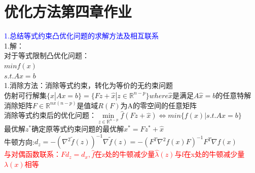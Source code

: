 \documentclass{article}
\begin{document}
{\centering\section*{优化方法第四章作业}}
\textcolor{blue}{1.总结等式约束凸优化问题的求解方法及相互联系}\\
1.解：\\
对于等式限制凸优化问题：\\
$min f(x)$\\
$s.t. Ax = b$\\
1.消除方法：消除等式约束，转化为等价的无约束问题\\
仿射可行解集$\{x|Ax = b\} = \{Fz + \hat{x} | z \in \mathbb{R}^{n-p}\} where \hat{x}$是满足$A\hat{x} = b$的任意特解\\
消除矩阵$F \in \mathbb{R}^{n x (n-p)}$是值域$R(F)$为A的零空间的任意矩阵\\
消除等式约束后的优化问题：$\min\limits_{z\in\mathbb{R}^{n-p}} \hat{f}(Fz + \hat{x}) \Leftrightarrow min\{f(x) | s.t.Ax = b\}$\\
最优解$z^*$确定原等式约束问题的最优解$x^* = Fz^* + \hat{x}$\\
牛顿方向:$d_z = -(\nabla ^2 \widetilde{f}(z))^{-1} \nabla \widetilde{f}(z) = -(F^T\nabla^2f(x)F)^{-1}F^T\nabla f(x)$\\
\textcolor{red}{与对偶函数联系：$Fd_z = d_x,\hat{f}$在z处的牛顿减少量$\hat{\lambda}(z)$与f在x处的牛顿减少量$\lambda(x)$相等}\\
\end{document}
